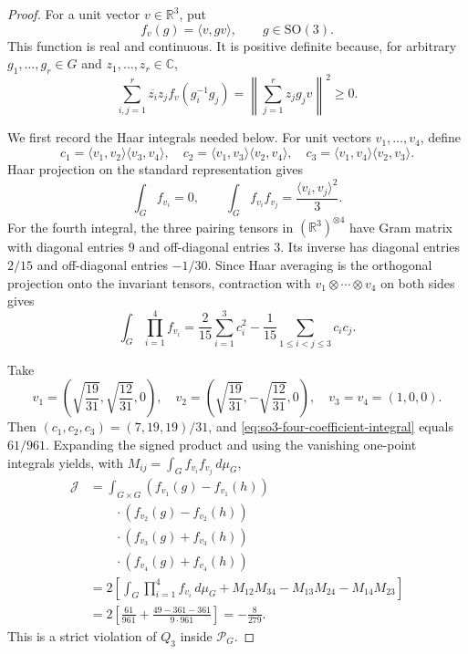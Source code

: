 \documentclass[11pt,reqno]{amsart}
\theoremstyle{plain}
\theoremstyle{definition}
\begin{document}
\begin{proof}
For a unit vector $v\in\mathbb R^3$, put
\[
 f_v(g)=\langle v,gv\rangle ,\qquad g\in\mathrm{SO}(3).
\]
This function is real and continuous.  It is positive definite because,
for arbitrary $g_1,\ldots,g_r\in G$ and $z_1,\ldots,z_r\in\mathbb C$,
\[
 \sum_{i,j=1}^r\overline{z_i}z_j f_v(g_i^{-1}g_j)
 =\left\lVert\sum_{j=1}^r z_jg_jv\right\rVert^2\geq0.
\]

We first record the Haar integrals needed below.  For unit vectors
$v_1,\ldots,v_4$, define
\[
 c_1=\langle v_1,v_2\rangle\langle v_3,v_4\rangle,
 \quad
 c_2=\langle v_1,v_3\rangle\langle v_2,v_4\rangle,
 \quad
 c_3=\langle v_1,v_4\rangle\langle v_2,v_3\rangle.
\]
Haar projection on the standard representation gives
\[
 \int_G f_{v_i}=0,
 \qquad
 \int_G f_{v_i}f_{v_j}
 =\frac{\langle v_i,v_j\rangle^2}{3}.
\]
For the fourth integral, the three pairing tensors in
$(\mathbb R^3)^{\otimes4}$ have Gram matrix with diagonal entries $9$ and
off-diagonal entries $3$.  Its inverse has diagonal entries $2/15$ and
off-diagonal entries $-1/30$.  Since Haar averaging is the orthogonal
projection onto the invariant tensors, contraction with
$v_1\otimes\cdots\otimes v_4$ on both sides gives
\begin{equation}
\label{eq:so3-four-coefficient-integral}
 \int_G\prod_{i=1}^4f_{v_i}
 =\frac2{15}\sum_{i=1}^3c_i^2
  -\frac1{15}\sum_{1\leq i<j\leq3}c_ic_j.
\end{equation}

Take
\[
 v_1=\left(\sqrt{\frac{19}{31}},\sqrt{\frac{12}{31}},0\right),
 \quad
 v_2=\left(\sqrt{\frac{19}{31}},-\sqrt{\frac{12}{31}},0\right),
 \quad
 v_3=v_4=(1,0,0).
\]
Then $(c_1,c_2,c_3)=(7,19,19)/31$, and
\eqref{eq:so3-four-coefficient-integral} equals $61/961$.  Expanding the
signed product and using the vanishing one-point integrals yields, with
$M_{ij}=\int_G f_{v_i}f_{v_j}\,d\mu_G$,
\[
\begin{aligned}
 \mathcal J&=\int_{G\times G}
 (f_{v_1}(g)-f_{v_1}(h))\\
 &\qquad{}\cdot(f_{v_2}(g)-f_{v_2}(h))\\
 &\qquad{}\cdot(f_{v_3}(g)+f_{v_3}(h))\\
 &\qquad{}\cdot(f_{v_4}(g)+f_{v_4}(h))\\
 &=2\left[\int_G\prod_{i=1}^4f_{v_i}\,d\mu_G
 +M_{12}M_{34}-M_{13}M_{24}-M_{14}M_{23}\right]\\
 &=2\left[\frac{61}{961}
  +\frac{49-361-361}{9\cdot961}\right]
 =-\frac8{279}.
\end{aligned}
\]
This is a strict violation of $Q_3$ inside $\mathcal P_G$.
\end{proof}
\end{document}
